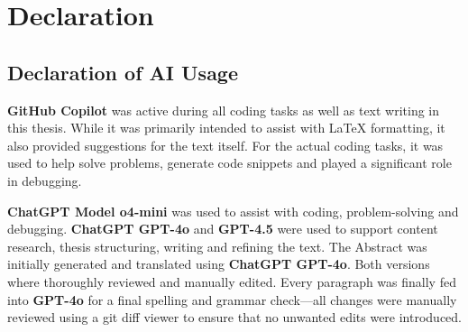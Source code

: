 


\section{Declaration}
\label{declaration}

\subsection{Declaration of AI Usage}%

\textbf{GitHub Copilot} was active during all coding tasks as well as text writing in this thesis.
While it was primarily intended to assist with LaTeX formatting, it also provided suggestions for the text itself.
For the actual coding tasks, it was used to help solve problems, generate code snippets and played a significant role in debugging.

\textbf{ChatGPT Model o4-mini} was used to assist with coding, problem-solving and debugging.
\textbf{ChatGPT GPT-4o} and \textbf{GPT-4.5} were used to support content research, thesis structuring, writing and refining the text.
The Abstract was initially generated and translated using \textbf{ChatGPT GPT-4o}.
Both versions where thoroughly reviewed and manually edited.
Every paragraph was finally fed into \textbf{GPT-4o} for a final spelling and grammar check---all changes were manually reviewed using a git diff viewer to ensure that no unwanted edits were introduced.

\newpage
{}


